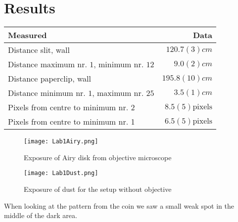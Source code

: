 \documentclass[11pt, A4paper, english]{article}
\begin{document}
		\section{Results}
			\begin{tabular}{|l|r|}
\hline
Measured & Data \\
\hline
Distance slit, wall & $120.7(3) cm$ \\
Distance maximum nr. $1$, minimum nr. $12$ & $9.0(2) cm$ \\
Distance paperclip, wall & $195.8(10) cm$ \\
Distance minimum nr. $1$, maximum nr. $25$ & $3.5(1) cm$ \\
Pixels from centre to minimum nr. 2 & $8.5(5) \text{pixels}$ \\
Pixels from centre to minimum nr. 1 & $6.5(5) \text{pixels}$ \\
\hline
			\end{tabular}
			\begin{figure}[H]
\texttt{[image: Lab1Airy.png]}
\caption{Exposure of Airy disk from objective microscope}
			\end{figure}
			\begin{figure}[H]
\texttt{[image: Lab1Dust.png]}
\caption{Exposure of dust for the setup without objective}
			\end{figure}
When looking at the pattern from the coin we saw a small weak spot in the middle of the dark area.
\end{document}
